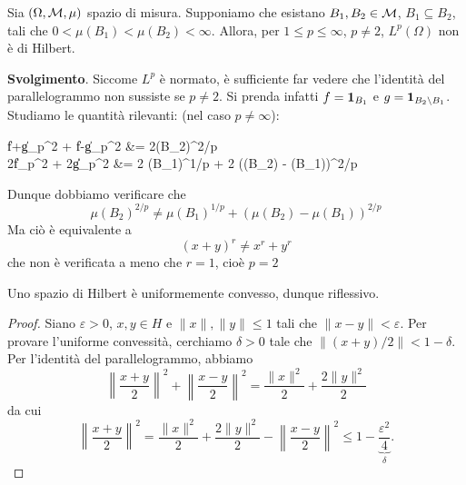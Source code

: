 \begin{exercise}
	Sia $(\Omega, \mathcal{M}, \mu)$ spazio di misura. Supponiamo che esistano $B_1, B_2 \in \mathcal{M}$, $B_1 \subseteq B_2$, tali che $0 < \mu(B_1) < \mu(B_2) < \infty$.
	Allora, per $1 \leq p \leq \infty$, $p \neq 2$, $L^p(\Omega)$ non è di Hilbert.

	\textbf{Svolgimento}.
	Siccome $L^p$ è normato, è sufficiente far vedere che l'identità del parallelogrammo non sussiste se $p \neq 2$. Si prenda infatti $f = {\boldsymbol{1}}_{B_1}$ e $g={\boldsymbol{1}}_{B_2 \setminus B_1}$.
	Studiamo le quantità rilevanti: (nel caso $p \neq \infty$):
	\begin{eqalign*}
		\|f+g\|_p^2 + \|f-g\|_p^2 &= 2\mu(B_2)^{2/p}\\
		2\|f\|_p^2 + 2\|g\|_p^2 &= 2 \mu(B_1)^{1/p} + 2 (\mu(B_2) - \mu(B_1))^{2/p}
	\end{eqalign*}
	Dunque dobbiamo verificare che
	\begin{equation*}
		\mu(B_2)^{2/p} \neq \mu(B_1)^{1/p} + (\mu(B_2) - \mu(B_1))^{2/p}
	\end{equation*}
	Ma ciò è equivalente a
	\begin{equation}
		(x+y)^r \neq x^r + y^r
	\end{equation}
	che non è verificata a meno che $r=1$, cioè $p=2$
\end{exercise}

\begin{theorem}
\label{th:hilb_reflexiv}
	Uno spazio di Hilbert è uniformemente convesso, dunque riflessivo.
\end{theorem}
\begin{proof}
	Siano $\varepsilon > 0$, $x,y \in H$ e $\|x\|, \|y\| \leq 1$ tali che $\|x-y\| < \varepsilon$. Per provare l'uniforme convessità, cerchiamo $\delta >0$ tale che $\|(x+y)/2\| < 1-\delta$.
	Per l'identità del parallelogrammo, abbiamo
	\begin{equation*}
		\left\|\frac{x+y}2\right\|^2+\left\|\frac{x-y}2\right\|^2 = \frac{\|x\|^2}2 + \frac{2\|y\|^2}2
	\end{equation*}
	da cui
	\begin{equation*}
		\left\|\frac{x+y}2\right\|^2 = \frac{\|x\|^2}2 + \frac{2\|y\|^2}2 - \left\|\frac{x-y}2\right\|^2 \leq 1 - \underbrace{\frac{\varepsilon^2}4}_\delta.
	\end{equation*}
\end{proof}

